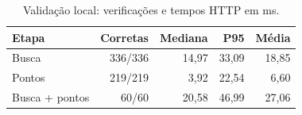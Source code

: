 \begin{table}[tb]
\caption{Validação local: verificações e tempos HTTP em ms.}
\label{tab:latencia}
\centering
\small
\setlength{\tabcolsep}{3pt}
\begin{tabular}{lrrrr}
\toprule
Etapa & Corretas & Mediana & P95 & Média \\
\midrule
Busca & 336/336 & 14,97 & 33,09 & 18,85 \\
Pontos & 219/219 & 3,92 & 22,54 & 6,60 \\
Busca + pontos & 60/60 & 20,58 & 46,99 & 27,06 \\
\bottomrule
\end{tabular}
\par{}
\end{table}
